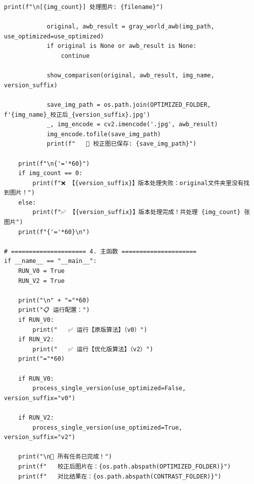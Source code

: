 \documentclass[12pt,a4paper,UTF8]{ctexart} %
\begin{document}
\begin{lstlisting}[caption={完整的自动白平衡Demo代码（awb\_demo_v2.py）}, label=code:full]
            print(f"\n[{img_count}] 处理图片: {filename}")
            
            original, awb_result = gray_world_awb(img_path, use_optimized=use_optimized)
            if original is None or awb_result is None:
                continue
            
            show_comparison(original, awb_result, img_name, version_suffix)
            
            save_img_path = os.path.join(OPTIMIZED_FOLDER, f'{img_name}_校正后_{version_suffix}.jpg')
            _, img_encode = cv2.imencode('.jpg', awb_result)
            img_encode.tofile(save_img_path)
            print(f"   💾 校正图已保存: {save_img_path}")
    
    print(f"\n{'='*60}")
    if img_count == 0:
        print(f"❌ 【{version_suffix}】版本处理失败：original文件夹里没有找到图片！")
    else:
        print(f"✅ 【{version_suffix}】版本处理完成！共处理 {img_count} 张图片")
    print(f"{'='*60}\n")

# ===================== 4. 主函数 =====================
if __name__ == "__main__":
    RUN_V0 = True
    RUN_V2 = True
    
    print("\n" + "="*60)
    print("📋 运行配置：")
    if RUN_V0:
        print("   ✅ 运行【原版算法】（v0）")
    if RUN_V2:
        print("   ✅ 运行【优化版算法】（v2）")
    print("="*60)
    
    if RUN_V0:
        process_single_version(use_optimized=False, version_suffix="v0")
    
    if RUN_V2:
        process_single_version(use_optimized=True, version_suffix="v2")
    
    print("\n🎉 所有任务已完成！")
    print(f"   校正后图片在：{os.path.abspath(OPTIMIZED_FOLDER)}")
    print(f"   对比结果在：{os.path.abspath(CONTRAST_FOLDER)}")
\end{lstlisting}
\end{document}
